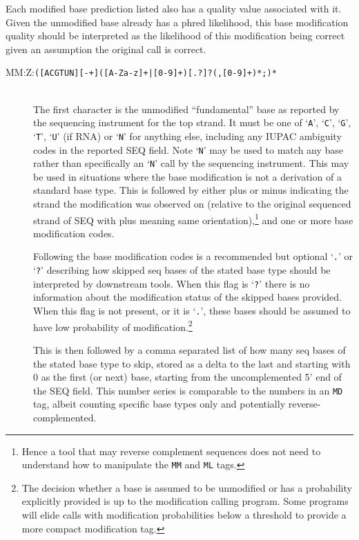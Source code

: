 \documentclass[10pt]{article}
\newcommand{\tagregex}[1]{{\tt #1}}
\begin{document}
Each modified base prediction listed also has a quality value associated with it.
Given the unmodified base already has a phred likelihood, this base modification quality should be interpreted as the likelihood of this modification being correct given an assumption the original call is correct.

\begin{description}
\item[MM:Z:\tagregex{([ACGTUN][-+]([A-Za-z]+|[0-9]+)[.?]?(,[0-9]+)*;)*}]
\hfill\\
The first character is the unmodified ``fundamental'' base as reported
by the sequencing instrument for the top strand.
It must be one of `{\tt A}', `{\tt C}', `{\tt G}', `{\tt T}', `{\tt U}' (if RNA) or `{\tt N}' for anything else, including any IUPAC ambiguity codes in the reported SEQ field.
Note `{\tt N}' may be used to match any base rather than specifically an `{\tt N}' call by the sequencing instrument.
This may be used in situations where the base modification is not a derivation of a standard base type.
This is followed by either plus or minus indicating the strand the modification was observed on (relative to the original sequenced strand of {\sf SEQ} with plus meaning same orientation),\footnote{Hence a tool that may reverse complement sequences does not need to understand how to manipulate the {\tt MM} and {\tt ML} tags.} and one or more base modification codes.

Following the base modification codes is a recommended but optional `{\tt .}' or `{\tt ?}' describing how skipped seq bases of the stated base type should be interpreted by downstream tools.
When this flag is `{\tt ?}' there is no information about the modification status of the skipped bases provided.
When this flag is not present, or it is `{\tt .}', these bases should be assumed to have low probability of modification.\footnote{The decision whether a base is assumed to be unmodified or has a probability explicitly provided is up to the modification calling program. Some programs will elide calls with modification probabilities below a threshold to provide a more compact modification tag.}

This is then followed by a comma separated list of how many seq bases of the stated base type to skip, stored as a delta to the last and starting with 0 as the first (or next) base, starting from the uncomplemented 5' end of the {\sf SEQ} field.
This number series is comparable to the numbers in an {\tt MD} tag,
albeit counting specific base types only and potentially reverse-complemented.


\end{description}
\end{document}
